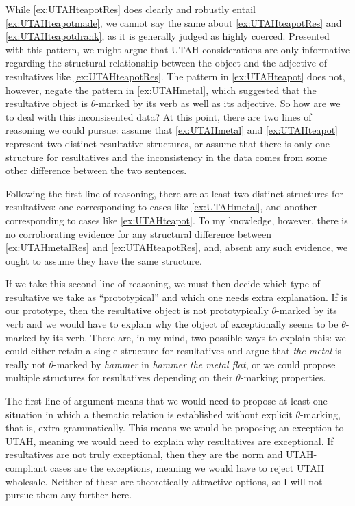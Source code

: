 \documentclass[MilwayThesis]{subfiles}
\begin{document}
While \cref{ex:UTAHteapotRes} does clearly and robustly entail \cref{ex:UTAHteapotmade}, we cannot say the same about \cref{ex:UTAHteapotRes} and \cref{ex:UTAHteapotdrank}, as it is generally judged as highly coerced.
Presented with this pattern, we might argue that UTAH considerations are only informative regarding the structural relationship between the object and the adjective of resultatives like \cref{ex:UTAHteapotRes}.
The pattern in \cref{ex:UTAHteapot} does not, however, negate the pattern in \cref{ex:UTAHmetal}, which suggested that the resultative object is $\theta$-marked by its verb as well as its adjective.
So how are we to deal with this inconsisented data?
At this point, there are two lines of reasoning we could pursue: assume that \cref{ex:UTAHmetal} and \cref{ex:UTAHteapot} represent two distinct resultative structures, or assume that there is only one structure for resultatives and the inconsistency in the data comes from some other difference between the two sentences. 

Following the first line of reasoning, there are at least two distinct structures for resultatives: one corresponding to cases like \cref{ex:UTAHmetal}, and another corresponding to cases like \cref{ex:UTAHteapot}.
To my knowledge, however, there is no corroborating evidence for any structural difference between \cref{ex:UTAHmetalRes} and \cref{ex:UTAHteapotRes}, and, absent any such evidence, we ought to assume they have the same structure.

If we take this second line of reasoning, we must then decide which type of resultative we take as ``prototypical'' and which one needs extra explanation.
If \Last[a] is our prototype, then the resultative object is not prototypically $\theta$-marked by its verb and we would have to explain why the object of \LLast[a] exceptionally seems to be $\theta$-marked by its verb.
There are, in my mind, two possible ways to explain this: we could either retain a single structure for resultatives and argue that \textit{the metal} is really not $\theta$-marked by \textit{hammer} in \textit{hammer the metal flat}, or we could propose multiple structures for resultatives depending on their $\theta$-marking properties.

The first line of argument means that we would need to propose at least one situation in which a thematic relation is established without explicit $\theta$-marking, that is, extra-grammatically.
This means we would be proposing an exception to UTAH, meaning we would need to explain why resultatives are exceptional.
If resultatives are not truly exceptional, then they are the norm and UTAH-compliant cases are the exceptions, meaning we would have to reject UTAH wholesale.
Neither of these are theoretically attractive options, so I will not pursue them any further here.
\end{document}
